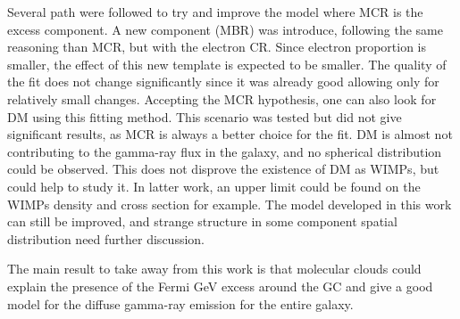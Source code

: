 Several path were followed to try and improve the model where MCR is the excess component. A new component (MBR) was introduce, following the same reasoning than MCR, but with the electron CR. Since electron proportion is smaller, the effect of this new template is expected to be smaller. The quality of the fit does not change significantly since it was already good allowing only for relatively small changes.
Accepting the MCR hypothesis, one can also look for DM using this fitting method. This scenario was tested but did not give significant results, as MCR is always a better choice for the fit. DM is almost not contributing to the gamma-ray flux in the galaxy, and no spherical distribution could be observed. This does not disprove the existence of DM as WIMPs, but could help to study it. In latter work, an upper limit could be found on the WIMPs density and cross section for example.
The model developed in this work can still be improved, and strange structure in some component spatial distribution need further discussion.

The main result to take away from this work is that molecular clouds could explain the presence of the Fermi GeV excess around the GC and give a good model for the diffuse gamma-ray emission for the entire galaxy.

